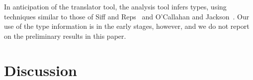 \begin{description}
% 
% 
% 
% 
% 
% 
% 
% 

\end{description}

In anticipation of the translator tool, the analysis tool infers
types, using techniques similar to those of Siff and Reps~\cite{Siff-fse96}
and O'Callahan and Jackson~\cite{OCallahan-icse97}.  Our use of the
type information is in the early stages, however, and we do not report
on the preliminary results in this paper.



\section{Discussion}\label{sec:discussion}

